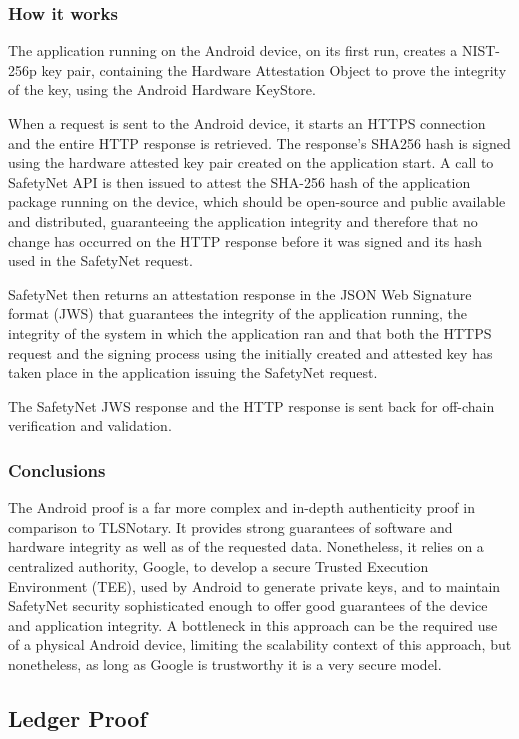 \subsubsection{How it works}
The application running on the Android device, on its first run, creates a NIST-256p key pair, containing the Hardware Attestation Object to prove the integrity of the key, using the Android Hardware KeyStore.

When a request is sent to the Android device, it starts an HTTPS connection and the entire HTTP response is retrieved. The response's SHA256 hash is signed using the hardware attested key pair created on the application start. A call to SafetyNet API is then issued to attest the SHA-256 hash of the application package running on the device, which should be open-source and public available and distributed, guaranteeing the application integrity and therefore that no change has occurred on the HTTP response before it was signed and its hash used in the SafetyNet request.

SafetyNet then returns an attestation response in the JSON Web Signature format (JWS) that guarantees the integrity of the application running, the integrity of the system in which the application ran and that both the HTTPS request and the signing process using the initially created and attested key has taken place in the application issuing the SafetyNet request.

The SafetyNet JWS response and the HTTP response is sent back for off-chain verification and validation.

\subsubsection{Conclusions}
The Android proof is a far more complex and in-depth authenticity proof in comparison to TLSNotary. It provides strong guarantees of software and hardware integrity as well as of the requested data. Nonetheless, it relies on a centralized authority, Google, to develop a secure Trusted Execution Environment (TEE), used by Android to generate private keys, and to maintain SafetyNet security sophisticated enough to offer good guarantees of the device and application integrity. A bottleneck in this approach can be the required use of a physical Android device, limiting the scalability context of this approach, but nonetheless, as long as Google is trustworthy it is a very secure model.

\subsection{Ledger Proof}

